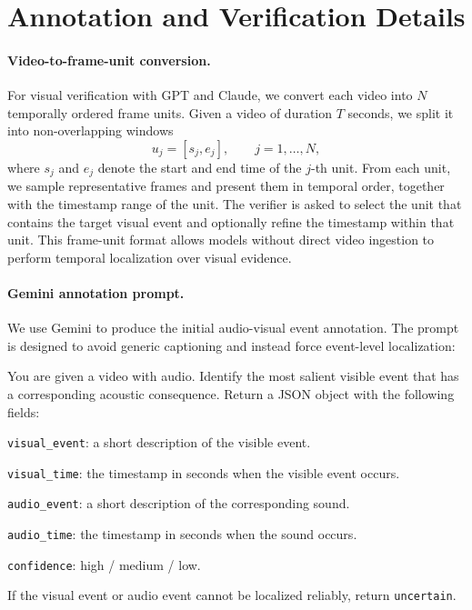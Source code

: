 \section{Annotation and Verification Details}
\label{app:annotation}

\paragraph{Video-to-frame-unit conversion.}
For visual verification with GPT and Claude, we convert each video into $N$ temporally ordered frame units. Given a video of duration $T$ seconds, we split it into non-overlapping windows
\[
    u_j = [s_j, e_j], \qquad j=1,\ldots,N,
\]
where $s_j$ and $e_j$ denote the start and end time of the $j$-th unit. From each unit, we sample representative frames and present them in temporal order, together with the timestamp range of the unit. The verifier is asked to select the unit that contains the target visual event and optionally refine the timestamp within that unit. This frame-unit format allows models without direct video ingestion to perform temporal localization over visual evidence.

\paragraph{Gemini annotation prompt.}
We use Gemini to produce the initial audio-visual event annotation. The prompt is designed to avoid generic captioning and instead force event-level localization:
\begin{tcolorbox}[colback=gray!3,colframe=gray!35,boxrule=0.5pt,arc=2pt]
\small
You are given a video with audio. Identify the most salient visible event that has a corresponding acoustic consequence.  
Return a JSON object with the following fields:

\texttt{visual\_event}: a short description of the visible event.  

\texttt{visual\_time}: the timestamp in seconds when the visible event occurs.  

\texttt{audio\_event}: a short description of the corresponding sound.  

\texttt{audio\_time}: the timestamp in seconds when the sound occurs.  

\texttt{confidence}: high / medium / low.

If the visual event or audio event cannot be localized reliably, return \texttt{uncertain}.
\end{tcolorbox}

